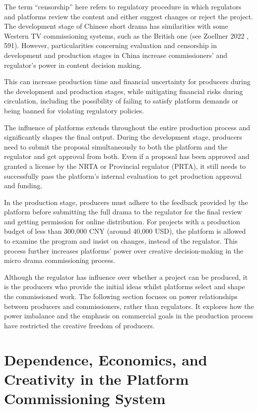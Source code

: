 \documentclass[10pt,a4paper]{article}
\begin{document}
The term “censorship” here refers to regulatory procedure in which regulators and platforms review the content and either suggest changes or reject the project. The development stage of Chinese short drama has similarities with some Western TV commissioning systems, such as the British one (see Zoellner 2022 , 591). However, particularities concerning evaluation and censorship in development and production stages in China increase commissioners’ and regulator’s power in content decision making.\par
This can increase production time and financial uncertainty for producers during the development and production stages, while mitigating financial risks during circulation, including the possibility of failing to satisfy platform demands or being banned for violating regulatory policies.\par
The influence of platforms extends throughout the entire production process and significantly shapes the final output. During the development stage, producers need to submit the proposal simultaneously to both the platform and the regulator and get approval from both. Even if a proposal has been approved and granted a license by the NRTA or Provincial regulator (PRTA), it still needs to successfully pass the platform’s internal evaluation to get production approval and funding.\par
In the production stage, producers must adhere to the feedback provided by the platform before submitting the full drama to the regulator for the final review and getting permission for online distribution. For projects with a production budget of less than 300,000 CNY (around 40,000 USD), the platform is allowed to examine the program and insist on changes, instead of the regulator. This process further increases platforms’ power over creative decision-making in the micro drama commissioning process.\par
Although the regulator has influence over whether a project can be produced, it is the producers who provide the initial ideas whilst platforms select and shape the commissioned work. The following section focuses on power relationships between producers and commissioners, rather than regulators. It explores how the power imbalance and the emphasis on commercial goals in the production process have restricted the creative freedom of producers.\par
\section*{Dependence, Economics, and Creativity in the Platform Commissioning System}
\end{document}
